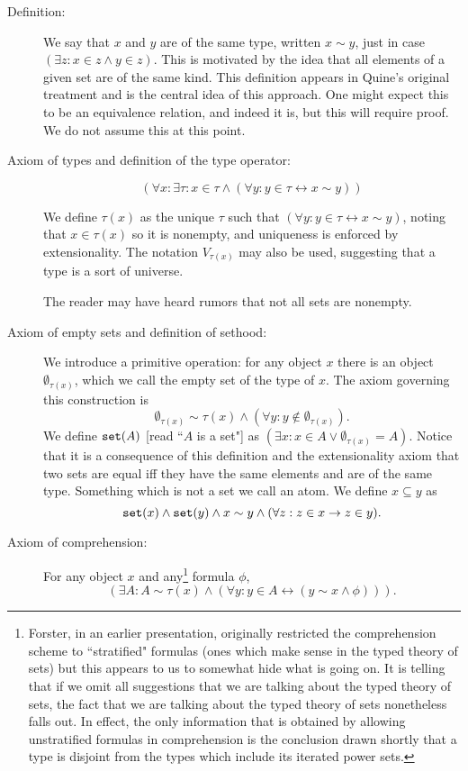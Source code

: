 \documentclass[12pt]{article}
\begin{document}
\begin{description}

\item[Definition:]  We say that $x$ and $y$ are of the same type, written $x \sim y$, just in case $(\exists z:x \in z \wedge y \in z)$.  This is motivated by the idea that all elements of a given set are of the same kind.  This definition appears in Quine's original treatment and is the central idea of this approach.  One might expect this to be an equivalence relation, and indeed it is, but this will require proof.  We do not assume this at this point.

\item[Axiom of types and definition of the type operator:]  $$(\forall x:\exists \tau:x \in \tau \wedge (\forall y:y \in \tau \leftrightarrow x \sim y))$$

We define $\tau(x)$ as the unique $\tau$ such that $(\forall y:y \in \tau \leftrightarrow x \sim y)$, noting that
$x \in \tau(x)$ so it is nonempty, and uniqueness is enforced by extensionality.  The notation $V_{\tau(x)}$ may also be used, suggesting that a type is a sort of universe.

The reader may have heard rumors that not all sets are nonempty.

\item[Axiom of empty sets and definition of sethood:]  We introduce a primitive operation:  for any object $x$ there is an object $\emptyset_{\tau(x)}$, which we call the empty set of the type of $x$.   The axiom governing this construction is
$$\emptyset_{\tau(x)} \sim \tau(x) \wedge (\forall y:y \not\in \emptyset_{\tau(x)}).$$  We define ${\tt set}(A)$ [read ``$A$ is a set"] as $(\exists x:x \in A \vee \emptyset_{\tau(x)} = A)$.  Notice that it is a consequence of this definition and the extensionality axiom that two sets are equal iff they have the same elements and are of the same type.  Something which is not a set we call an atom.  We define $x \subseteq y$ as $${\tt set}(x) \wedge {\tt set}(y) \wedge x \sim y \wedge (\forall z:z \in x \rightarrow z \in y).$$


\item[Axiom of comprehension:]  For any object $x$ and any\footnote{Forster, in an earlier presentation,  originally restricted the comprehension scheme to ``stratified" formulas (ones which make sense in the typed theory of sets) but this appears to us to somewhat hide what is going on.  It is telling that if we omit all suggestions that we are talking about the typed theory of sets,
the fact that we are talking about the typed theory of sets nonetheless falls out.  In effect, the only information that is obtained by allowing unstratified formulas in comprehension is the conclusion drawn shortly that a type is disjoint from the types which include its iterated power sets.} formula $\phi$, $$(\exists A:A \sim \tau(x) \wedge (\forall y:y \in A \leftrightarrow (y \sim x \wedge \phi))).$$


\end{description}
\end{document}
